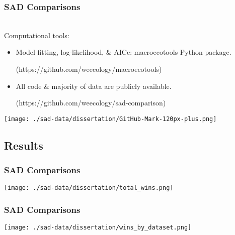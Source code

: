 \documentclass[14pt]{beamer}
\begin{document}
\begin{frame}
\frametitle{SAD Comparisons}
~\\
Computational tools:
\begin{itemize}
\item Model fitting, log-likelihood, \& AICc: macroecotools Python package.\\
\begin{small}
(https://github.com/weecology/macroecotools)
\end{small}
\item All code \& majority of data are publicly available.
\begin{small}
(https://github.com/weecology/sad-comparison)
\end{small}
\end{itemize}
\begin{center}
\texttt{[image: ./sad-data/dissertation/GitHub-Mark-120px-plus.png]}
\end{center}
\end{frame}



\subsection{Results}
\begin{frame}{}
\frametitle{SAD Comparisons}
\texttt{[image: ./sad-data/dissertation/total\_wins.png]}
\end{frame}

\begin{frame}{}
\frametitle{SAD Comparisons}
\texttt{[image: ./sad-data/dissertation/wins\_by\_dataset.png]}
\end{frame}
\end{document}
